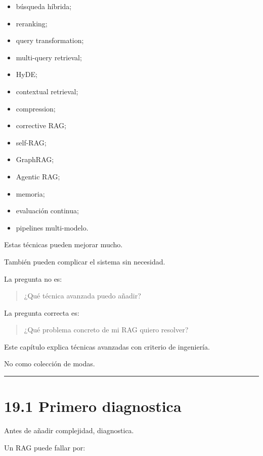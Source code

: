\begin{itemize}
\tightlist
\item
  búsqueda híbrida;
\item
  reranking;
\item
  query transformation;
\item
  multi-query retrieval;
\item
  HyDE;
\item
  contextual retrieval;
\item
  compression;
\item
  corrective RAG;
\item
  self-RAG;
\item
  GraphRAG;
\item
  Agentic RAG;
\item
  memoria;
\item
  evaluación continua;
\item
  pipelines multi-modelo.
\end{itemize}

Estas técnicas pueden mejorar mucho.

También pueden complicar el sistema sin necesidad.

La pregunta no es:

\begin{quote}
¿Qué técnica avanzada puedo añadir?
\end{quote}

La pregunta correcta es:

\begin{quote}
¿Qué problema concreto de mi RAG quiero resolver?
\end{quote}

Este capítulo explica técnicas avanzadas con criterio de ingeniería.

No como colección de modas.

\begin{center}\rule{0.5\linewidth}{0.5pt}\end{center}

\section{19.1 Primero diagnostica}\label{primero-diagnostica}

Antes de añadir complejidad, diagnostica.

Un RAG puede fallar por:

